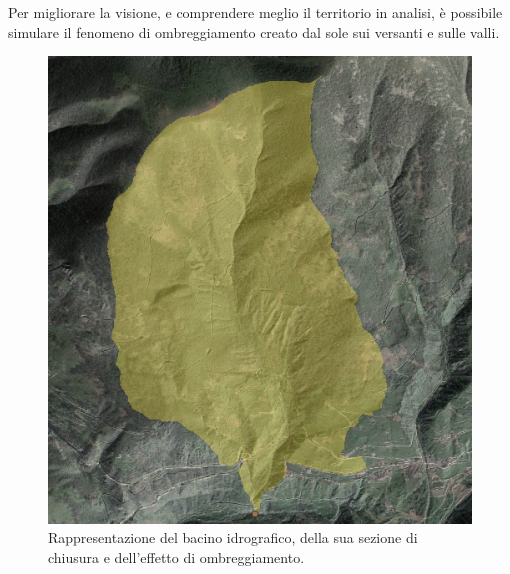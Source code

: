 Per migliorare la visione, e comprendere meglio il territorio in analisi, è possibile simulare il fenomeno di ombreggiamento creato dal sole sui versanti e sulle valli.
\begin{figure}[H]\centering
    \includegraphics[scale=.50]{immagini/bacino_ombreggiatura_qgis.PNG}
    \caption{Rappresentazione del bacino idrografico, della sua sezione di chiusura e dell'effetto di ombreggiamento.}
    \label{bacino_ombreggiatura_qgis}
\end{figure}

